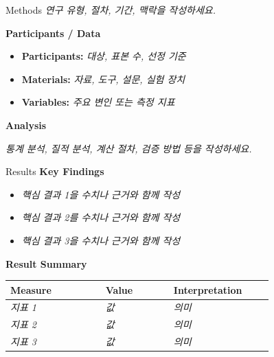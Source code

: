 \documentclass[a0paper,portrait]{KNUE_baposter}
\newcommand{\TemplateText}[1]{{\color{aaublue2}\itshape #1}}
\begin{document}
\begin{poster}
\begin{posterbox}[name=methods,column=0,below=introduction]{Methods}
\scriptsize
\TemplateText{연구 유형, 절차, 기간, 맥락을 작성하세요.}

\vspace{0.6em}
\footnotesize
\textbf{Participants / Data}

\scriptsize
\begin{itemize}
\item \textbf{Participants:} \TemplateText{대상, 표본 수, 선정 기준}
\item \textbf{Materials:} \TemplateText{자료, 도구, 설문, 실험 장치}
\item \textbf{Variables:} \TemplateText{주요 변인 또는 측정 지표}
\end{itemize}

\vspace{0.6em}
\footnotesize
\textbf{Analysis}

\scriptsize
\TemplateText{통계 분석, 질적 분석, 계산 절차, 검증 방법 등을 작성하세요.}
\end{posterbox}

%
\begin{posterbox}[name=results,column=1,below=boxlayoutguide]{Results}
\footnotesize
\textbf{Key Findings}

\scriptsize
\begin{itemize}
\item \TemplateText{핵심 결과 1을 수치나 근거와 함께 작성}
\item \TemplateText{핵심 결과 2를 수치나 근거와 함께 작성}
\item \TemplateText{핵심 결과 3을 수치나 근거와 함께 작성}
\end{itemize}

\vspace{0.6em}
\footnotesize
\textbf{Result Summary}

\scriptsize
\begin{center}
\begin{tabular}{p{0.28\linewidth}p{0.20\linewidth}p{0.28\linewidth}}
\toprule
\textbf{Measure} & \textbf{Value} & \textbf{Interpretation} \\
\midrule
\TemplateText{지표 1} & \TemplateText{값} & \TemplateText{의미} \\
\TemplateText{지표 2} & \TemplateText{값} & \TemplateText{의미} \\
\TemplateText{지표 3} & \TemplateText{값} & \TemplateText{의미} \\
\bottomrule
\end{tabular}
\end{center}
\end{posterbox}


\end{poster}
\end{document}
